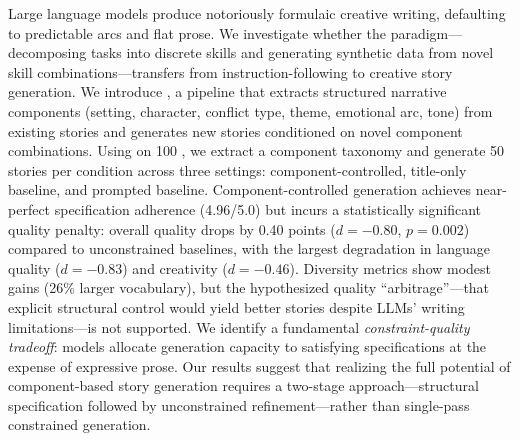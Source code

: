Large language models produce notoriously formulaic creative writing, defaulting to predictable arcs and flat prose.
We investigate whether the \skillmix paradigm---decomposing tasks into discrete skills and generating synthetic data from novel skill combinations---transfers from instruction-following to creative story generation.
We introduce \methodname, a pipeline that extracts structured narrative components (setting, character, conflict type, theme, emotional arc, tone) from existing stories and generates new stories conditioned on novel component combinations.
Using \gptfour on 100 \rocstories, we extract a component taxonomy and generate 50 stories per condition across three settings: component-controlled, title-only baseline, and prompted baseline.
Component-controlled generation achieves near-perfect specification adherence (4.96/5.0) but incurs a statistically significant quality penalty: overall quality drops by 0.40 points ($d{=}{-}0.80$, $p{=}0.002$) compared to unconstrained baselines, with the largest degradation in language quality ($d{=}{-}0.83$) and creativity ($d{=}{-}0.46$).
Diversity metrics show modest gains (26\% larger vocabulary), but the hypothesized quality ``arbitrage''---that explicit structural control would yield better stories despite LLMs' writing limitations---is not supported.
We identify a fundamental \emph{constraint-quality tradeoff}: models allocate generation capacity to satisfying specifications at the expense of expressive prose.
Our results suggest that realizing the full potential of component-based story generation requires a two-stage approach---structural specification followed by unconstrained refinement---rather than single-pass constrained generation.
